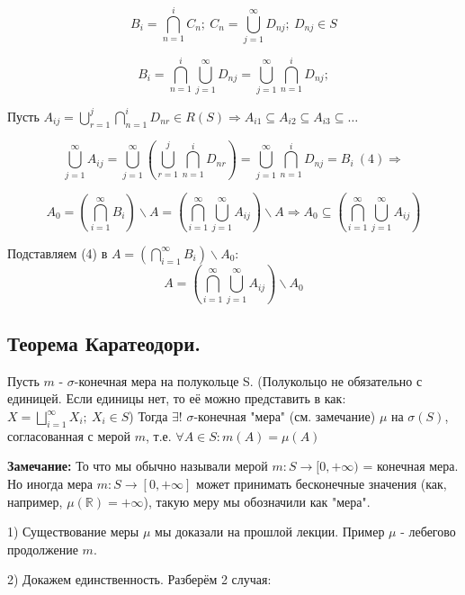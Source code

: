 $$B_i = \bigcap^i_{n=1} C_n;\ C_n = \bigcup^{\infty}_{j=1} D_{nj};\ D_{nj} \in S$$

$$B_i = \bigcap^i_{n=1} \bigcup^{\infty}_{j=1} D_{nj} = \bigcup^{\infty}_{j = 1} \bigcap^{i}_{n = 1} D_{nj}; $$

Пусть $A_{ij} = \bigcup^{j}_{r = 1} \bigcap^{i}_{n = 1} D_{nr} \in R(S) \Rightarrow A_{i1} \subseteq A_{i2} \subseteq A_{i3} \subseteq \dots $

$$\bigcup^{\infty}_{j = 1} A_{ij} = \bigcup^{\infty}_{j = 1} (\bigcup^{j}_{r = 1} \bigcap^{i}_{n = 1} D_{nr}) = \bigcup^{\infty}_{j = 1} \bigcap^{i}_{n = 1} D_{nj} = B_i\ (4) \Rightarrow$$

$$A_0 = (\bigcap^{\infty}_{i=1} B_i) \backslash A = (\bigcap_{i=1}^{\infty} \bigcup_{j=1}^{\infty} A_{ij}) \backslash A \Rightarrow A_0 \subseteq (\bigcap_{i=1}^{\infty} \bigcup_{j=1}^{\infty} A_{ij})$$

Подставляем (4) в $A = (\bigcap^{\infty}_{i=1} B_i) \backslash A_0$:
$$A = (\bigcap_{i=1}^{\infty} \bigcup_{j=1}^{\infty} A_{ij}) \backslash A_0$$



\EndProof

\subsection*{Теорема Каратеодори.}

Пусть $m$ - $\sigma$-конечная мера на полукольце S. (Полукольцо не обязательно с единицей. Если единицы нет, то её можно представить в как: $X = \bigsqcup^{\infty}_{i=1} X_i;\ X_i \in S$)
Тогда $\exists!$ $\sigma$-конечная "мера" (см. замечание) $\mu$ на $\sigma(S)$, согласованная с мерой $m$, т.е. $\forall A \in S: m(A) = \mu(A)$

\textbf{Замечание:} То что мы обычно называли мерой $m: S \rightarrow [0, +\infty)$ = конечная мера. Но иногда мера $m: S \rightarrow [0, +\infty]$ может принимать бесконечные значения (как, например, $\mu(\mathbb{R}) = +\infty$), такую меру мы обозначили как "мера".

\Proof

1) Существование меры $\mu$ мы доказали на прошлой лекции. Пример $\mu$ - лебегово продолжение $m$.

2) Докажем единственность. Разберём 2 случая:

